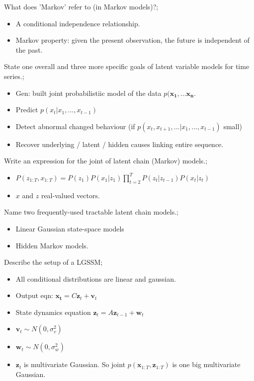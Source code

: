 \documentclass{article}
\begin{document}
What does 'Markov' refer to (in Markov models)?; \begin{itemize} \item A conditional independence relationship.  \item Markov property: given the present observation, the future is independent of the past.  \end{itemize}

State one overall and three more specific goals of latent variable models for time series.; \begin{itemize} \item Gen: built joint probabilistiic model of the data $p(\mathbf{x_1,...x_n}$.  \item Predict $p(x_t|x_1,...,x_{t-1})$ \item Detect abnormal changed behaviour (if $p(x_t, x_{t+1}, ...|x_1,...,x_{t-1})$ small) \item Recover underlying / latent / hidden causes linking entire sequence.  \end{itemize}

Write an expression for the joint of latent chain (Markov) models.; \begin{itemize} \item $P(z_{1:T}, x_{1:T}) = P(z_1)P(x_1|z_1)\prod_{t=2}^TP(z_t|z_{t-1})P(x_t|z_t)$ \item $x$ and $z$ real-valued vectors.  \end{itemize} 

Name two frequently-used tractable latent chain models.; \begin{itemize} \item Linear Gaussian state-space models \item Hidden Markov models.  \end{itemize}

Describe the setup of a LGSSM; \begin{itemize} \item All conditional distributions are linear and gaussian.  \item Output eqn: $\mathbf{x_t}=C\mathbf{z}_t+\mathbf{v}_t$ \item State dynamics equation $\mathbf{z}_t=A\mathbf{z}_{t-1}+\mathbf{w}_t$ \item $\mathbf{v}_t \sim N(0,\sigma^2_v)$ \item $\mathbf{w}_t \sim N(0,\sigma^2_w)$ \item $\mathbf{z}_t$ is multivariate Gaussian. So joint $p(\mathbf{x}_{1:T}, \mathbf{z}_{1:T})$ is one big multivariate Gaussian.  \end{itemize}
\end{document}
